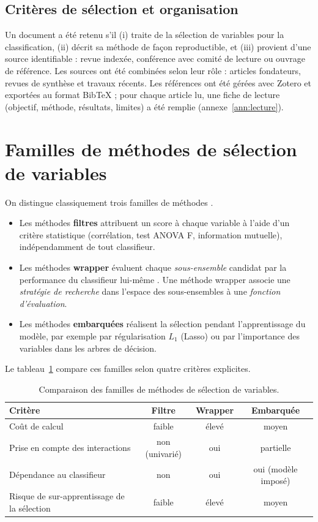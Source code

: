 \documentclass[11pt,a4paper]{report}
\begin{document}
\subsection{Critères de sélection et organisation}
Un document a été retenu s'il (i) traite de la sélection de variables pour la classification,
(ii) décrit sa méthode de façon reproductible, et (iii) provient d'une source identifiable : revue
indexée, conférence avec comité de lecture ou ouvrage de référence. Les sources ont été combinées
selon leur rôle : articles fondateurs, revues de synthèse et travaux récents. Les références ont
été gérées avec Zotero et exportées au format BibTeX ; pour chaque article lu, une fiche de lecture
(objectif, méthode, résultats, limites) a été remplie (annexe~\ref{ann:lecture}).

\section{Familles de méthodes de sélection de variables}
On distingue classiquement trois familles de méthodes \cite{guyon2003}.
\begin{itemize}
  \item Les méthodes \textbf{filtres} attribuent un score à chaque variable à l'aide d'un critère
        statistique (corrélation, test ANOVA F, information mutuelle), indépendamment de tout
        classifieur.
  \item Les méthodes \textbf{wrapper} évaluent chaque \emph{sous-ensemble} candidat par la
        performance du classifieur lui-même \cite{kohavi1997}. Une méthode wrapper associe une
        \emph{stratégie de recherche} dans l'espace des sous-ensembles à une \emph{fonction
        d'évaluation}.
  \item Les méthodes \textbf{embarquées} réalisent la sélection pendant l'apprentissage du modèle,
        par exemple par régularisation $L_1$ (Lasso) ou par l'importance des variables dans les
        arbres de décision.
\end{itemize}
Le tableau~\ref{tab:familles} compare ces familles selon quatre critères explicites.

\begin{table}[H]
\centering
\caption{Comparaison des familles de méthodes de sélection de variables.}
\label{tab:familles}
\begin{tabular}{@{}lccc@{}}
\toprule
Critère & Filtre & Wrapper & Embarquée \\
\midrule
Coût de calcul                           & faible & élevé  & moyen \\
Prise en compte des interactions          & non (univarié) & oui & partielle \\
Dépendance au classifieur                 & non    & oui    & oui (modèle imposé) \\
Risque de sur-apprentissage de la sélection & faible & élevé & moyen \\
\bottomrule
\end{tabular}
\end{table}
\end{document}
